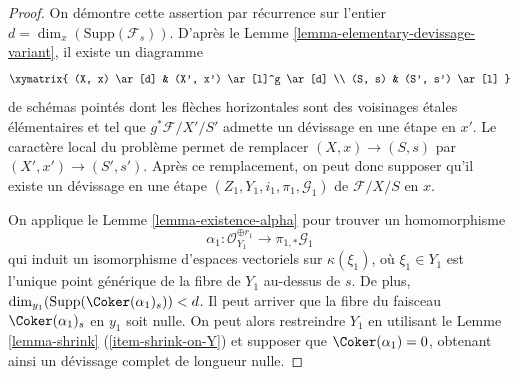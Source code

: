 \begin{proof}
On démontre cette assertion par récurrence sur l'entier
$d = \dim_x(\text{Supp}(\mathcal{F}_s))$.
D'après le
Lemme \ref{lemma-elementary-devissage-variant},
il existe un diagramme
$$
\xymatrix{
(X, x) \ar[d] & (X', x') \ar[l]^g \ar[d] \\
(S, s) & (S', s') \ar[l]
}
$$
de schémas pointés dont les flèches
horizontales sont des voisinages \'etales élémentaires
et tel que $g^*\mathcal{F}/X'/S'$ admette un d\'evissage en une étape en $x'$.
Le caractère local du problème permet de remplacer
$(X, x) \to (S, s)$ par $(X', x') \to (S', s')$. Après ce remplacement,
on peut donc supposer qu'il existe un d\'evissage en une étape
$(Z_1, Y_1, i_1, \pi_1, \mathcal{G}_1)$ de $\mathcal{F}/X/S$ en $x$.

\medskip\noindent
On applique
le Lemme \ref{lemma-existence-alpha}
pour trouver un homomorphisme
$$
\alpha_1 :
\mathcal{O}_{Y_1}^{\oplus r_1}
\longrightarrow
\pi_{1, *}\mathcal{G}_1
$$
qui induit un isomorphisme d'espaces vectoriels sur $\kappa(\xi_1)$,
où $\xi_1 \in Y_1$ est l'unique point générique de la fibre de
$Y_1$ au-dessus de $s$. De plus,\newline
$\dim_{y_1}(\text{Supp}(\Coker(\alpha_1)_s)) < d$.
Il peut arriver que la fibre du faisceau $\Coker(\alpha_1)_s$
en $y_1$ soit nulle. On peut alors restreindre $Y_1$ en utilisant
le Lemme \ref{lemma-shrink} (\ref{item-shrink-on-Y})
et supposer que $\Coker(\alpha_1) = 0$, obtenant ainsi un
d\'evissage complet de longueur nulle.


\end{proof}
